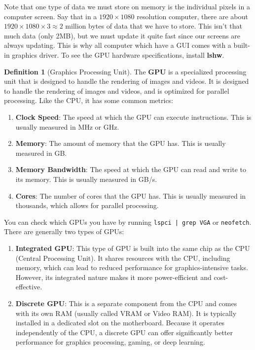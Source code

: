 \documentclass{article}
\theoremstyle{definition}
\newtheorem{definition}{Definition}[section]
\begin{document}
    Note that one type of data we must store on memory is the individual pixels in a computer screen. Say that in a $1920 \times 1080$ resolution computer, there are about $1920 \times 1080 \times 3 \approx 2$ million bytes of data that we have to store. This isn't that much data (only 2MB), but we must update it quite fast since our screens are always updating. This is why all computer which have a GUI comes with a built-in graphics driver. To see the GPU hardware specifications, install \textbf{lshw}. 

    \begin{definition}[Graphics Processing Unit]
      The \textbf{GPU} is a specialized processing unit that is designed to handle the rendering of images and videos. It is designed to handle the rendering of images and videos, and is optimized for parallel processing. Like the CPU, it has some common metrics: 
      \begin{enumerate} 
        \item \textbf{Clock Speed}: The speed at which the GPU can execute instructions. This is usually measured in MHz or GHz. 
        \item \textbf{Memory}: The amount of memory that the GPU has. This is usually measured in GB. 
        \item \textbf{Memory Bandwidth}: The speed at which the GPU can read and write to its memory. This is usually measured in GB/s. 
        \item \textbf{Cores}: The number of cores that the GPU has. This is usually measured in thousands, which allows for parallel processing. 
      \end{enumerate}
      You can check which GPUs you have by running \texttt{lspci | grep VGA} or \texttt{neofetch}. There are generally two types of GPUs: 
      \begin{enumerate} 
        \item \textbf{Integrated GPU}: This type of GPU is built into the same chip as the CPU (Central Processing Unit). It shares resources with the CPU, including memory, which can lead to reduced performance for graphics-intensive tasks. However, its integrated nature makes it more power-efficient and cost-effective. 
        \item \textbf{Discrete GPU}: This is a separate component from the CPU and comes with its own RAM (usually called VRAM or Video RAM). It is typically installed in a dedicated slot on the motherboard. Because it operates independently of the CPU, a discrete GPU can offer significantly better performance for graphics processing, gaming, or deep learning. 
      \end{enumerate}
    \end{definition}
\end{document}
